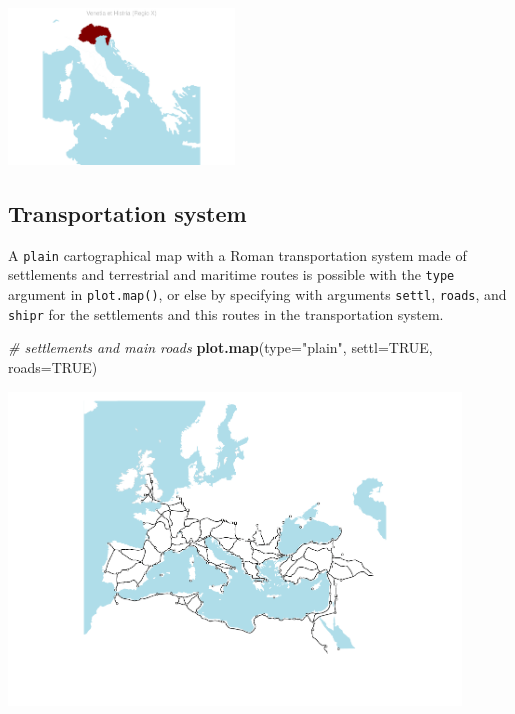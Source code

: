 \documentclass[a4paper,11pt]{memoir}
\newenvironment{Shaded}{\begin{snugshade}}{\end{snugshade}}
\newcommand{\CommentTok}[1]{\textcolor[rgb]{0.56,0.35,0.01}{\textit{#1}}}
\newcommand{\DataTypeTok}[1]{\textcolor[rgb]{0.13,0.29,0.53}{#1}}
\newcommand{\KeywordTok}[1]{\textcolor[rgb]{0.13,0.29,0.53}{\textbf{#1}}}
\newcommand{\NormalTok}[1]{#1}
\newcommand{\OtherTok}[1]{\textcolor[rgb]{0.56,0.35,0.01}{#1}}
\newcommand{\StringTok}[1]{\textcolor[rgb]{0.31,0.60,0.02}{#1}}
\begin{document}
{\centering
\includegraphics[width=6cm, trim=0 0 0 0, clip]{img/unnamed-chunk-7-1} 
}

\bigbreak
\bigbreak

\hypertarget{transportation-system}{%
\subsection{Transportation system}\label{transportation-system}}

A \texttt{plain} cartographical map with a Roman transportation system
made of settlements and terrestrial and maritime routes is possible with
the \texttt{type} argument in \texttt{plot.map()}, or else by specifying
with arguments \texttt{settl}, \texttt{roads}, and \texttt{shipr} for
the settlements and this routes in the transportation system.

\bigbreak
\bigbreak

\begin{Shaded}
\begin{Highlighting}[]
\CommentTok{# settlements and main roads}
\KeywordTok{plot.map}\NormalTok{(}\DataTypeTok{type=}\StringTok{"plain"}\NormalTok{, }\DataTypeTok{settl=}\OtherTok{TRUE}\NormalTok{, }\DataTypeTok{roads=}\OtherTok{TRUE}\NormalTok{)}
\end{Highlighting}
\end{Shaded}

{\centering
\includegraphics[width=12cm, trim=0 0 0 0, clip]{img/unnamed-chunk-8-1} 
}
\end{document}
